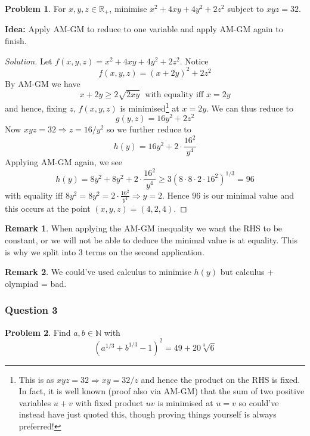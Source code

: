 \documentclass[11pt]{article}
\theoremstyle{definition}
\newtheorem*{problem}{Problem}
\newtheorem*{remark}{Remark}
\begin{document}
\begin{problem}
  For $x, y, z \in \mathbb{R}_+$, minimise $x^2 + 4xy + 4y^2 + 2z^2$ subject to $xyz = 32$. 
\end{problem}

{\bf Idea:} Apply AM-GM to reduce to one variable and apply AM-GM again to finish. 

\begin{proof}[Solution]
  Let $f(x, y, z) = x^2 + 4xy + 4y^2 + 2z^2$. Notice 
  \[f(x, y, z) = (x + 2y)^2 + 2z^2\]
  By AM-GM we have 
  \[x + 2y \geq 2\sqrt{2xy} \; \text{ with equality iff } x = 2y\]
  and hence, fixing $z$, $f(x,y,z)$ is minimised\footnote{This is as $xyz = 32 \Rightarrow xy = 32/z$ 
  and hence the product on the RHS is fixed. In fact, it is well known (proof also via AM-GM) that the sum of 
  two positive variables $u + v$ with fixed product $uv$ is minimised at $u=v$ so could've instead have just quoted 
  this, though proving things yourself is always preferred!} at $x=2y$. We can thus reduce to
  \[g(y, z) = 16y^2 + 2z^2\]
  Now $xyz = 32 \Rightarrow z = 16/y^2$ so we further reduce to
  \[h(y) = 16y^2 + 2 \cdot \frac{16^2}{y^4}\]
  Applying AM-GM again, we see 
  \[h(y) = 8y^2 + 8y^2 + 2 \cdot \frac{16^2}{y^4} \geq 3(8 \cdot 8 \cdot 2 \cdot 16^2)^{1/3} = 96\]
  with equality iff $8y^2 = 8y^2 = 2 \cdot \frac{16^2}{y^4} \Rightarrow y = 2$. Hence \underline{$96$} is our 
  minimal value and this occurs at the point $(x, y, z) = (4, 2, 4)$.
\end{proof}

\begin{remark}
  When applying the AM-GM inequality we want the RHS to be constant, or we will not be able to deduce the minimal 
  value is at equality. This is why we split into $3$ terms on the second application.
\end{remark}

\begin{remark}
  We could've used calculus to minimise $h(y)$ but calculus + olympiad = bad.
\end{remark}

\newpage 

\subsubsection{Question 3}

\begin{problem}
  Find $a, b \in \mathbb{N}$ with \[(a^{1/3} + b^{1/3} - 1)^2 = 49 + 20 \sqrt[3]{6}\]
\end{problem}
\end{document}
